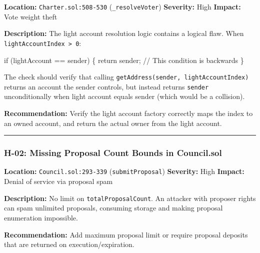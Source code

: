 \documentclass[
]{article}
\newenvironment{Shaded}{}{}
\newcommand{\NormalTok}[1]{#1}
\begin{document}
\textbf{Location:} \texttt{Charter.sol:508-530}
(\texttt{\_resolveVoter}) \textbf{Severity:} High \textbf{Impact:} Vote
weight theft

\textbf{Description:} The light account resolution logic contains a
logical flaw. When \texttt{lightAccountIndex\ \textgreater{}\ 0}:

\begin{Shaded}
\begin{Highlighting}[]
\NormalTok{if (lightAccount == sender) \{}
\NormalTok{    return sender;  // This condition is backwards}
\NormalTok{\}}
\end{Highlighting}
\end{Shaded}

The check should verify that calling
\texttt{getAddress(sender,\ lightAccountIndex)} returns an account the
sender controls, but instead returns \texttt{sender} unconditionally
when light account equals sender (which would be a collision).

\textbf{Recommendation:} Verify the light account factory correctly maps
the index to an owned account, and return the actual owner from the
light account.

\begin{center}\rule{0.5\linewidth}{0.5pt}\end{center}

\subsubsection{H-02: Missing Proposal Count Bounds in
Council.sol}\label{h-02-missing-proposal-count-bounds-in-councilsol}

\textbf{Location:} \texttt{Council.sol:293-339}
(\texttt{submitProposal}) \textbf{Severity:} High \textbf{Impact:}
Denial of service via proposal spam

\textbf{Description:} No limit on \texttt{totalProposalCount}. An
attacker with proposer rights can spam unlimited proposals, consuming
storage and making proposal enumeration impossible.

\begin{Shaded}
\end{Shaded}

\textbf{Recommendation:} Add maximum proposal limit or require proposal
deposits that are returned on execution/expiration.
\end{document}
